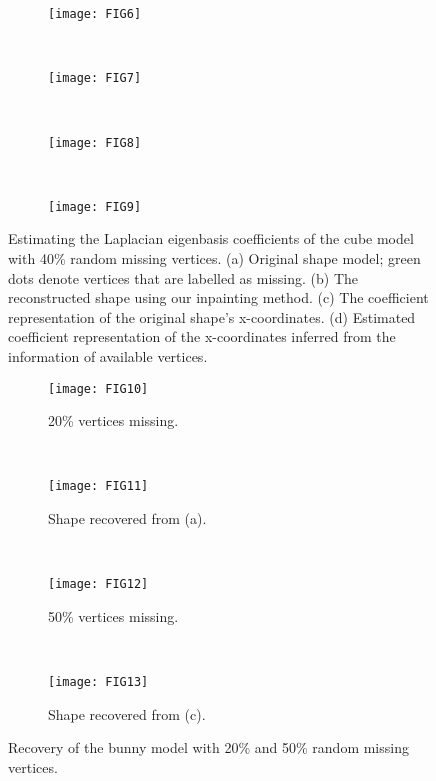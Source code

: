 \begin{figure}
    \centering
    \begin{subfigure}[b]{0.36\linewidth}
        \texttt{[image: FIG6]}
        \caption{}
    \end{subfigure}%
    ~
    \begin{subfigure}[b]{0.36\linewidth}
        \texttt{[image: FIG7]}
        \caption{}
    \end{subfigure}%
    \\
    \begin{subfigure}[b]{0.4\linewidth}
        \texttt{[image: FIG8]}
        \caption{}
    \end{subfigure}%
    ~
    \begin{subfigure}[b]{0.4\linewidth}
        \texttt{[image: FIG9]}
        \caption{}
    \end{subfigure}%
    \caption[Estimating Laplacian eigenbasis coefficients with partial cube model.]
      {Estimating the Laplacian eigenbasis coefficients of the
      cube model with 40\% random missing vertices. (a) Original shape model;
      green dots denote vertices that are labelled as missing. (b) The
      reconstructed shape using our inpainting method. (c) The
      coefficient representation of the original shape's
      x-coordinates. (d) Estimated coefficient representation of the
      x-coordinates inferred from the information of available
      vertices. }
\label{fig:cube:random:inpaint}
\end{figure}

\begin{figure}
  \centering
    \begin{subfigure}[b]{0.23\linewidth}
        \texttt{[image: FIG10]}
        \caption{20\% vertices missing.}
    \end{subfigure}
    ~
    \begin{subfigure}[b]{0.23\linewidth}
        \texttt{[image: FIG11]}
        \caption{Shape recovered from (a).}
    \end{subfigure}
    ~
    \begin{subfigure}[b]{0.23\linewidth}
        \texttt{[image: FIG12]}
        \caption{50\% vertices missing.}
    \end{subfigure}
    ~
    \begin{subfigure}[b]{0.23\linewidth}
        \texttt{[image: FIG13]}
        \caption{Shape recovered from (c).}
    \end{subfigure}
\caption[Recovery of the bunny model with random missing vertices.]
{Recovery of the bunny model with 20\% and 50\% random missing vertices.}
\label{fig:bunny:recovery}
\end{figure}

